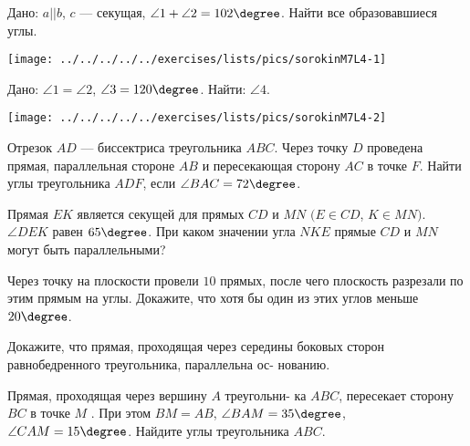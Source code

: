 \begin{class}[number=4]
	\begin{listofex}
		\item 
		\begin{minipage}[t]{\bodywidth}
			Дано: \( a || b \), \( c \) --- секущая, \( \angle 1 + \angle 2 = 102\degree \). Найти все образовавшиеся углы.
		\end{minipage}
		\hspace{0.02\linewidth}
		\begin{minipage}[t]{\picwidth}
			\texttt{[image: ../../../../../exercises/lists/pics/sorokinM7L4-1]}
		\end{minipage}
		\item 
		\begin{minipage}[t]{\bodywidth}
			Дано: \( \angle 1 = \angle 2\), \(  \angle 3 = 120\degree \). Найти: \( \angle 4 \).
		\end{minipage}
		\hspace{0.02\linewidth}
		\begin{minipage}[t]{\picwidth}
			\texttt{[image: ../../../../../exercises/lists/pics/sorokinM7L4-2]}
		\end{minipage}
		\item Отрезок \( AD \) --- биссектриса треугольника \( ABC \). Через точку \( D \) проведена прямая, параллельная стороне \( AB \) и пересекающая сторону \( AC \) в точке \( F \). Найти углы треугольника \( ADF \), если \( \angle BAC = 72\degree \).
		\item Прямая \( EK \) является секущей для прямых \( CD \) и \( MN  \) \( (E \in CD \), \(K \in MN) \). \( \angle DEK  \) равен \( 65\degree \). При каком значении угла \( NKE  \) прямые \( CD  \) и \( MN  \) могут быть параллельными?
		\item Через точку на плоскости провели \( 10 \) прямых, после
		чего плоскость разрезали по этим прямым на углы. Докажите,
		что хотя бы один из этих углов меньше \( 20\degree \).
		\item Докажите, что прямая, проходящая через середины
		боковых сторон равнобедренного треугольника, параллельна ос-
		нованию.
		\item Прямая, проходящая через вершину \( A \) треугольни-
		ка \( ABC \), пересекает сторону \( BC \) в точке \( M \) . При этом \( BM
		= AB \), \( \angle BAM = 35\degree \), \( \angle CAM = 15\degree \). Найдите углы треугольника \( ABC \).
		\item 

\end{listofex}
\end{class}
